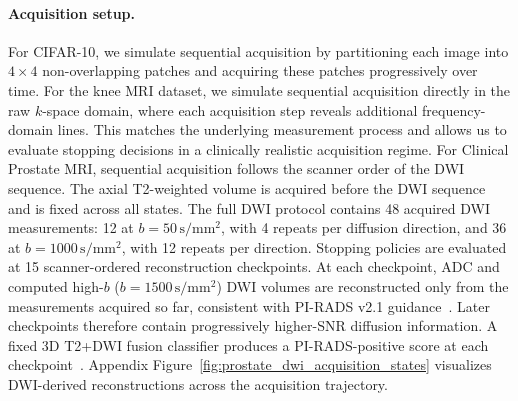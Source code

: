 
\paragraph{Acquisition setup.} For CIFAR-10, we simulate sequential acquisition by partitioning each image into $4 \times 4$ non-overlapping patches and acquiring these patches progressively over time. For the knee MRI dataset, we simulate sequential acquisition directly in the raw $k$-space domain, where each acquisition step reveals additional frequency-domain lines. This matches the underlying measurement process and allows us to evaluate stopping decisions in a clinically realistic acquisition regime.
For Clinical Prostate MRI, sequential acquisition follows the scanner order of the DWI sequence. The axial T2-weighted volume is acquired before the DWI sequence and is fixed across all states. The full DWI protocol contains 48 acquired DWI measurements: 12 at $b=50\,\mathrm{s/mm^2}$, with 4 repeats per diffusion direction, and 36 at $b=1000\,\mathrm{s/mm^2}$, with 12 repeats per direction. Stopping policies are evaluated at 15 scanner-ordered reconstruction checkpoints. At each checkpoint, ADC and computed high-$b$ ($b=1500\,\mathrm{s/mm^2}$) DWI volumes are reconstructed only from the measurements acquired so far, consistent with PI-RADS v2.1 guidance~\citep{turkbey2019pirads}. Later checkpoints therefore contain progressively higher-SNR diffusion information. A fixed 3D T2+DWI fusion classifier produces a PI-RADS-positive score at each checkpoint~\citep{johnson2025prostate}. Appendix Figure~\ref{fig:prostate_dwi_acquisition_states} visualizes DWI-derived reconstructions across the acquisition trajectory.

